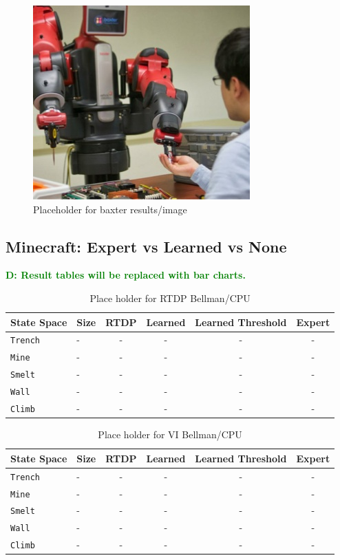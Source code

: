 \documentclass[conference]{IEEEtran}
\newcommand{\dnote}[1]{\textcolor{Green}{\textbf{D: #1}}}
\begin{document}
\begin{figure}[H]
\centering
\includegraphics[scale=0.195]{figures/baxter_temp.jpg}%
  \caption{Placeholder for baxter results/image}
  \label{fig:baxter_results}
\end{figure}

\subsection{Minecraft: Expert vs Learned vs None}

\dnote{Result tables will be replaced with bar charts.}

\begin{table}[H]
\centering
\begin{tabular}{ l  l || c c c c }
  State Space 		&	Size 	&	RTDP 	& Learned & Learned Threshold & Expert 	\\ \hline
  \texttt{Trench}  	& 	-	&	-		&	-	&	-			&	-	\\
  \texttt{Mine}  		& 	-	&	-		&	-	&	-  			&	-	\\
  \texttt{Smelt}  		& 	-	&	-		&	-	&	-  			&	-	\\
  \texttt{Wall}  		& 	-	&	-		&	-	&	-			&	-	\\
  \texttt{Climb}  		& 	-	&	-		&	-	&	- 			&	-	\\
\end{tabular}
\caption{Place holder for RTDP Bellman/CPU}
\label{table:minecraft_results_bellman}
\end{table}

\begin{table}[H]
\centering
\begin{tabular}{ l l || c c c c }
  State Space 		&	Size 	&	RTDP 	& Learned & Learned Threshold & Expert 	\\ \hline
  \texttt{Trench}  	& 	-	&	-		&	-	&	-			&	-	\\
  \texttt{Mine}  		& 	-	&	-		&	-	&	-  			&	-	\\
  \texttt{Smelt}  		& 	-	&	-		&	-	&	-  			&	-	\\
  \texttt{Wall}  		& 	-	&	-		&	-	&	-			&	-	\\
  \texttt{Climb}  		& 	-	&	-		&	-	&	- 			&	-	\\
\end{tabular}
\caption{Place holder for VI Bellman/CPU}
\label{table:minecraft_results_bellman}
\end{table}
\end{document}

